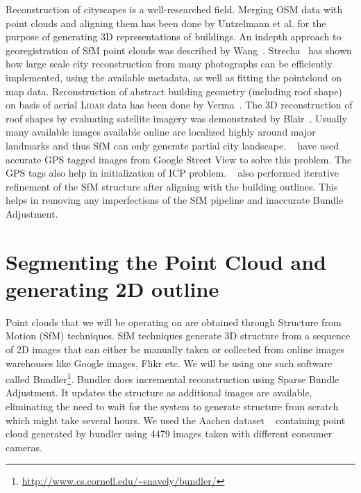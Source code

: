 \documentclass[10pt,twocolumn,letterpaper]{article}
\begin{document}
Reconstruction of cityscapes is a well-researched field. Merging OSM data with point clouds and aligning them has been done by Untzelmann et al. \cite{6755957} for the purpose of generating 3D representations of buildings. An indepth approach to georegistration of SfM point clouds was described by Wang~\cite{wang2013accurate}. Strecha~\cite{EPFL-CONF-148247} has shown how large scale city reconstruction from many photographs can be efficiently implemented, using the available metadata, as well as fitting the pointcloud on map data. Reconstruction of abstract building geometry (including roof shape) on basis of aerial \textsc{Lidar} data has been done by Verma~\cite{verma20063d}. The 3D reconstruction of roof shapes by evaluating satellite imagery was demonstrated by Blair~\cite{blair2012towards}. Usually many available images available online are localized highly around major landmarks and thus SfM can only generate partial city landscape. ~\cite{wang2013accurate} have used accurate GPS tagged images from Google Street View to solve this problem. The GPS tags also help in initialization of ICP problem. ~\cite{grzeszczuk2009creating} also performed iterative refinement of the SfM structure after aligning with the building outlines. This helps in removing any imperfections of the SfM pipeline and inaccurate Bundle Adjustment.


\section{Segmenting the Point Cloud and generating 2D outline}

Point clouds that we will be operating on are obtained through Structure from Motion (SfM) techniques. SfM techniques generate 3D structure from a sequence of 2D images that can either be manually taken or collected from online images warehouses like Google images, Flikr etc. We will be using one such software called Bundler\footnote{\url{http://www.cs.cornell.edu/~snavely/bundler/}}. Bundler does incremental reconstruction using Sparse Bundle Adjustment. It updates the structure as additional images are available, eliminating the need to wait for the system to generate structure from scratch which might take several hours. We used the Aachen dataset ~\cite{sattler2012image} containing point cloud generated by bundler using 4479 images taken with different consumer cameras.
\end{document}
